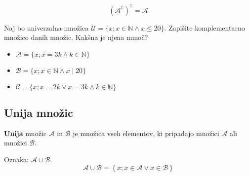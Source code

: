                 \begin{figure}[H]
                    \centering
                \end{figure}

            $$\left( \mathcal{A}^\complement\right)^\complement=\mathcal{A} $$
            
            \begin{naloga}
                Naj bo univerzalna množica $\mathcal{U}=\{x; x\in\mathbb{N} \land x\leq 20\}$. 
                Zapišite komplementarno množico danih množic. Kakšna je njena mmoč?
                \begin{itemize}
                    \item $\mathcal{A}=\{x; x=3k \land k\in\mathbb{N}\}$
                    \item $\mathcal{B}=\{x; x\in\mathbb{N} \land x\mid 20\}$
                    \item $\mathcal{C}=\{x; x=2k \lor x=3k \land k\in\mathbb{N}\}$
                \end{itemize}
            \end{naloga}



        \subsection{Unija množic}
                    \textbf{Unija} množic $\mathcal{A}$ in $\mathcal{B}$ je množica vseh elementov, ki pripadajo 
                    množici $\mathcal{A}$ ali množici $\mathcal{B}$.

                    Oznaka: $\mathbf{\mathcal{A}\cup\mathcal{B}}$.
                    $$ \mathcal{A}\cup\mathcal{B}=\left\{x; x\in\mathcal{A}\lor x\in\mathcal{B}\right\} $$



